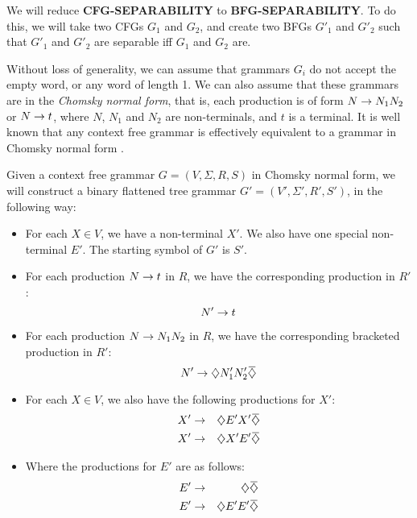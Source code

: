 \documentclass{article}
\begin{document}
We will reduce {\bf CFG-SEPARABILITY} to {\bf BFG-SEPARABILITY}. To do this,
we will take two CFGs $G_1$ and $G_2$, and create two BFGs $G'_1$ and $G'_2$
such that $G'_1$ and $G'_2$ are separable iff $G_1$ and $G_2$ are.

Without loss of generality, we can assume that grammars $G_i$ do not accept the
empty word, or any word of length 1. We can also assume that these grammars
are in the \emph{Chomsky normal form}, that is, each production is of form
$N \rightarrow N_1 N_2$ or $N \rightarrow t$, where $N$, $N_1$ and $N_2$ are non-terminals,
and $t$ is a terminal. It is well known that any context free grammar is effectively
equivalent to a grammar in Chomsky normal form \cite{hu79}.

Given a context free grammar $G = (V, \Sigma, R, S)$
in Chomsky normal form, we will construct a 
binary flattened
tree grammar $G' = (V', \Sigma', R', S')$, in the following way:

\begin{itemize}
\item For each $X \in V$, we have a non-terminal $X'$. We also
have one special non-terminal $E'$. The starting symbol of $G'$ is $S'$.

\item For each production $N \rightarrow t$ in $R$, we have the corresponding production in $R'$:
\begin{equation}
N' \rightarrow t \label{gp_terminal}
\end{equation}

\item For each production $N \rightarrow N_1 N_2$ in $R$, we have the corresponding
bracketed production in $R'$:
\begin{equation}
N' \ra \oa N_1' N_2' \ca \label{gp_bracketed}
\end{equation}

\item For each $X \in V$, we also have the following productions for $X'$:
\begin{eqnarray}
X' &\ra& \oa E' X' \ca \label{gp_leftempty} \\
X' &\ra& \oa X' E' \ca \label{gp_rightempty}
\end{eqnarray}

\item Where the productions for $E'$ are as follows:
\begin{eqnarray}
E' &\ra& \oa \ca \label{gp_leaf} \\
E' &\ra& \oa E' E' \label{gp_fork} \ca
\end{eqnarray}

\end{itemize}
\end{document}
